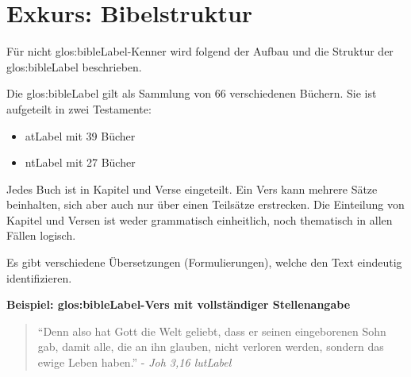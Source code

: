 \section{Exkurs: Bibelstruktur}
Für nicht \gls{glos:bibleLabel}-Kenner wird folgend der Aufbau und die Struktur der \gls{glos:bibleLabel} beschrieben.

Die \gls{glos:bibleLabel} gilt als Sammlung von 66 verschiedenen Büchern.
Sie ist aufgeteilt in zwei Testamente:
\begin{itemize}
	\item \gls{atLabel} mit 39 Bücher
	\item \gls{ntLabel} mit 27 Bücher
\end{itemize}
Jedes Buch ist in Kapitel und Verse eingeteilt. Ein Vers kann mehrere Sätze beinhalten, sich aber auch nur über einen Teilsätze erstrecken.
Die Einteilung von Kapitel und Versen ist weder grammatisch einheitlich, noch thematisch in allen Fällen logisch.

Es gibt verschiedene Übersetzungen (Formulierungen), welche den Text eindeutig identifizieren.


\begin{framed}
	\textbf{Beispiel: \gls{glos:bibleLabel}-Vers mit vollständiger Stellenangabe}
	\begin{quote}
		"`Denn also hat Gott die Welt geliebt, dass er seinen eingeborenen Sohn gab, damit alle, die an ihn glauben, nicht verloren werden, sondern das ewige Leben haben."' - \textit{Joh 3,16 \gls{lutLabel}\footnotemark}
	\end{quote}
\end{framed}
